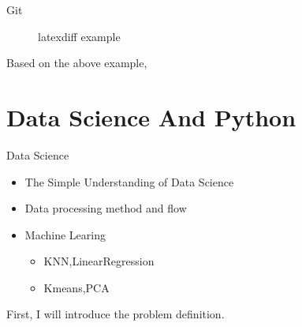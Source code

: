 \documentclass[
 size=12pt,
 paper=smartboard,  %
 mode=present, 		%
 display=slides, 	%
 style=tuliplab,  	%
 pauseslide,
 fleqn,leqno]{powerdot}
\begin{document}
\begin{slide}{Git}
{\begin{figure}
        \caption{latexdiff example}
      \end{figure}
      }



\begin{note}
Based on the above example,
\end{note}

\end{slide}


\section{Data Science And Python}

\begin{slide}{Data Science}
  \begin{center}
  \begin{itemize}
    \item
    The Simple Understanding of Data Science
    \item
    Data processing method and flow
    \item
    Machine Learing
    \begin{itemize}
      \item
      KNN,LinearRegression
      \item
      Kmeans,PCA
    \end{itemize}
  \end{itemize}
  \end{center}
  \begin{note}
  First, I will introduce the problem definition.
  \end{note}
  
  \end{slide}
\end{document}
